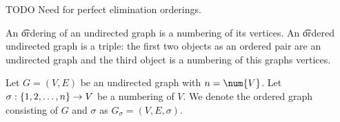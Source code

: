 
\sbasic






















\sstart
{}


TODO
Need for perfect elimination orderings.


An \t{ordering} of an undirected graph is a numbering of its vertices.
An \t{ordered undirected graph} is a triple: the first two objects as an ordered pair are an undirected graph and the third object is a numbering of this graphs vertices.


Let $G = (V, E)$ be an undirected graph with $n = \num{V}$.
Let $\sigma: \{1, 2, \dots, n\} \to V$ be a numbering of $V$.
We denote the ordered graph consisting of $G$ and $\sigma$ as $G_{\sigma} = (V, E, \sigma)$.
\strats
